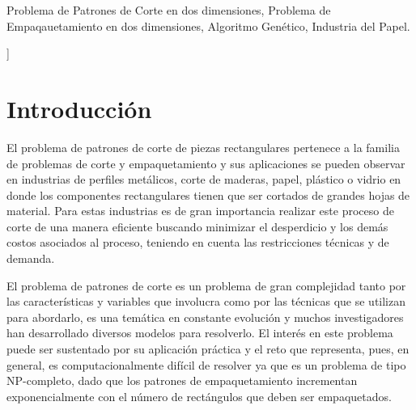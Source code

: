 \documentclass[a4paper,10pt,twocolumn]{article}
\begin{document}
\begin{keywords}
	Problema de Patrones de Corte en dos dimensiones,
	Problema de Empaqauetamiento en dos dimensiones,
	Algoritmo Genético,
	Industria del Papel.
\end{keywords}



\vspace{0.8cm}
]



\section{Introducción}\label{sec:intro}
El problema de patrones de corte de piezas rectangulares pertenece a
la familia de problemas de corte y empaquetamiento y sus
aplicaciones se pueden observar en industrias de perfiles
metálicos, corte de maderas, papel, plástico o vidrio en
donde los componentes rectangulares tienen que ser
cortados de grandes hojas de material. Para estas industrias es de gran importancia realizar
este proceso de corte de una manera eficiente buscando
minimizar el desperdicio y los demás costos asociados
al proceso, teniendo en cuenta las restricciones técnicas
y de demanda. 



El problema de patrones de corte es un problema de gran
complejidad tanto por las características y variables
que involucra como por las técnicas que se utilizan
para abordarlo, es una temática en constante evolución
y muchos investigadores han desarrollado diversos
modelos para resolverlo. El interés en este problema
puede ser sustentado por su aplicación práctica y el
reto que representa, pues, en general,
es computacionalmente difícil de resolver ya que es un
problema de tipo NP-completo, dado que los patrones de
empaquetamiento incrementan exponencialmente con el
número de rectángulos que deben ser empaquetados. 
 
\end{document}

